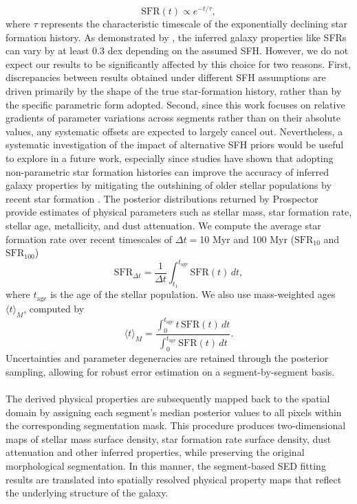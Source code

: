 \documentclass[fleqn,usenatbib]{mnras}
\begin{document}
\begin{equation}
\mathrm{SFR}(t) \propto e^{-t/\tau},
\end{equation}
where $\tau$ represents the characteristic timescale of the exponentially declining star formation history. As demonstrated by \citet{2019Carnall}, the inferred galaxy properties like SFRs can vary by at least 0.3 dex depending on the assumed SFH. However, we do not expect our results to be significantly affected by this choice for two reasons. First, discrepancies between results obtained under different SFH assumptions are driven primarily by the shape of the true star-formation history, rather than by the specific parametric form adopted. Second, since this work focuses on relative gradients of parameter variations across segments rather than on their absolute values, any systematic offsets are expected to largely cancel out. Nevertheless, a systematic investigation of the impact of alternative SFH priors would be useful to explore in a future work, especially since studies have shown that adopting non-parametric star formation histories can improve the accuracy of inferred galaxy properties by mitigating the outshining of older stellar populations by recent star formation \citep{2025Euclid}. The posterior distributions returned by Prospector provide estimates of physical parameters such as stellar mass, star formation rate, stellar age, metallicity, and dust attenuation. We compute the average star formation rate over recent timescales of $\Delta t=$10 Myr and 100 Myr ($\mathrm{SFR_{10}}$ and $\mathrm{SFR_{100}}$)
\begin{equation}
\mathrm{SFR}_{\Delta t}
=\frac{1}{\Delta t} \int_{t_1}^{t_{\mathrm{age}}} \mathrm{SFR}(t)\, dt,
\end{equation}
where $t_{\mathrm{age}}$ is the age of the stellar population. We also use mass-weighted ages $\langle t \rangle_{M}$, computed by 
\begin{equation}
\langle t \rangle_{M} = \frac{\int_{0}^{t_{\mathrm{age}}} t\,\mathrm{SFR}(t)\,dt} {\int_{0}^{t_{\mathrm{age}}} \mathrm{SFR}(t)\,dt}.
\end{equation}
%
Uncertainties and parameter degeneracies are retained through the posterior sampling, allowing for robust error estimation on a segment-by-segment basis.\\
\\
The derived physical properties are subsequently mapped back to the spatial domain by assigning each segment’s median posterior values to all pixels within the corresponding segmentation mask. This procedure produces two-dimensional maps of stellar mass surface density, star formation rate surface density, dust attenuation and other inferred properties, while preserving the original morphological segmentation. 
In this manner, the segment-based SED fitting results are translated into spatially resolved physical property maps that reflect the underlying structure of the galaxy.
\end{document}
